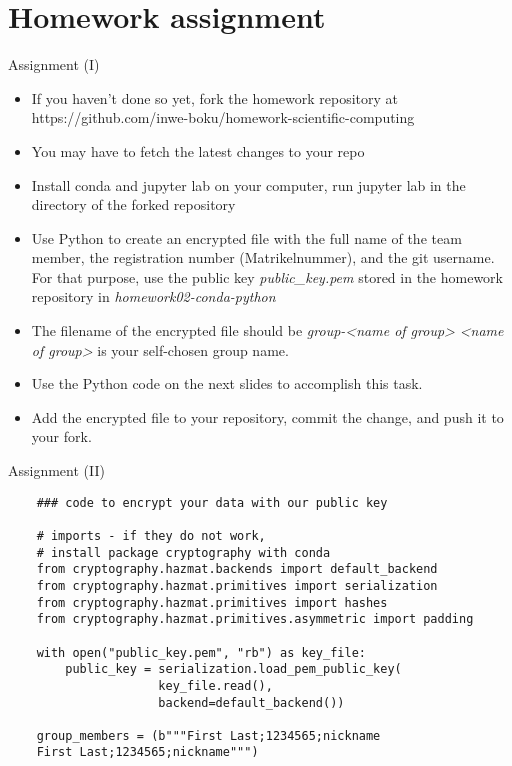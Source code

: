 
\section{Homework assignment}

\begin{frame}{Assignment (I)}

	\begin{itemize}
		\item If you haven't done so yet, fork the homework repository at https://github.com/inwe-boku/homework-scientific-computing
		\item You may have to fetch the latest changes to your repo
		\item Install conda and jupyter lab on your computer, run jupyter lab in the directory of the forked repository
		\item Use Python to create an encrypted file with the full name of the team member, the registration number (Matrikelnummer), and the git username. For that purpose, use the public key \textit{public\_key.pem} stored in the homework repository in \textit{homework02-conda-python}
		\item The filename of the encrypted file should be \textit{group-<name of group>} \textit{<name of group>} is your self-chosen group name.
		\item Use the Python code on the next slides to accomplish this task.
		\item Add the encrypted file to your repository, commit the change, and push it to your fork.
	\end{itemize}


\end{frame}

\begin{frame}[fragile]{Assignment (II)}

	\begin{verbatim}
	### code to encrypt your data with our public key

	# imports - if they do not work,
	# install package cryptography with conda
	from cryptography.hazmat.backends import default_backend
	from cryptography.hazmat.primitives import serialization
	from cryptography.hazmat.primitives import hashes
	from cryptography.hazmat.primitives.asymmetric import padding

	with open("public_key.pem", "rb") as key_file:
	    public_key = serialization.load_pem_public_key(
	                 key_file.read(),
	                 backend=default_backend())

	group_members = (b"""First Last;1234565;nickname
    First Last;1234565;nickname""")
	\end{verbatim}

\end{frame}

